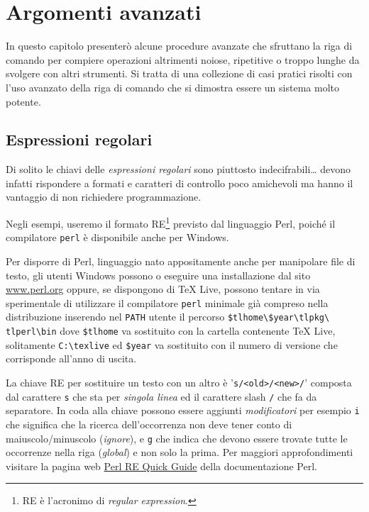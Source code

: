 
\chapter{Argomenti avanzati}
\label{chapAvanz}

In questo capitolo presenterò alcune procedure avanzate che sfruttano la riga di
comando per compiere operazioni altrimenti noiose, ripetitive o troppo lunghe da
svolgere con altri strumenti. Si tratta di una collezione di casi pratici
risolti con l'uso avanzato della riga di comando che si dimostra essere un
sistema molto potente.

\section{Espressioni regolari}

Di solito le chiavi delle \emph{espressioni regolari} sono piuttosto
indecifrabili\dots{} devono infatti rispondere a formati e caratteri di
controllo poco amichevoli ma hanno il vantaggio di non richiedere
programmazione.

Negli esempi, useremo il formato RE\footnote{RE è l'acronimo di \emph{regular
expression}.} previsto dal linguaggio Perl, poiché il compilatore \texttt{perl}
è disponibile anche per Windows.

Per disporre di Perl, linguaggio nato appositamente anche per manipolare file di
testo, gli utenti Windows possono o eseguire una installazione dal sito
\url{www.perl.org} oppure, se dispongono di \TeX{} Live, possono tentare in via
sperimentale di utilizzare il compilatore \texttt{perl} minimale già compreso
nella distribuzione inserendo nel \texttt{PATH} utente il percorso
\texttt{\$tlhome\textbackslash\$year\textbackslash tlpkg\textbackslash
tlperl\textbackslash bin} dove \texttt{\$tlhome} va sostituito con la cartella
contenente \TeX{} Live, solitamente \texttt{C:\textbackslash texlive} ed
\texttt{\$year} va sostituito con il numero di versione che corrisponde all'anno
di uscita.

La chiave RE per sostituire un testo con un altro è '\verb=s/<old>/<new>/='
composta dal carattere \texttt{s} che sta per \emph{singola linea} ed il
carattere slash \texttt{/} che fa da separatore. In coda alla chiave possono
essere aggiunti \emph{modificatori} per esempio \texttt{i} che significa che la
ricerca dell'occorrenza non deve tener conto di maiuscolo/minuscolo
(\emph{ignore}), e \texttt{g} che indica che devono essere trovate tutte le
occorrenze nella riga (\emph{global}) e non solo la prima. Per maggiori
approfondimenti visitare la pagina web
\href{http://perldoc.perl.org/perlrequick.html}{Perl RE Quick Guide} della
documentazione Perl.


